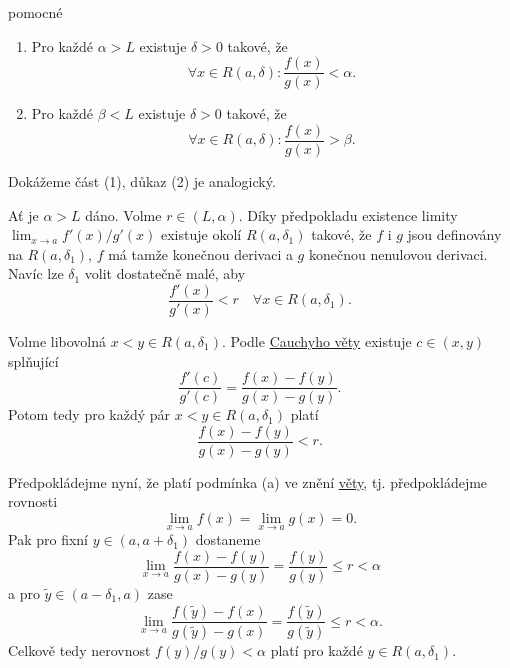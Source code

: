 \begin{lemma*}{pomocné}
 \begin{enumerate}
  \item Pro každé $\alpha > L$ existuje $\delta>0$ takové, že
  \[
   \forall x \in R(a,\delta): \frac{f(x)}{g(x)} < \alpha.
  \]
 \item Pro každé $\beta < L$ existuje $\delta>0$ takové, že
 \[
  \forall x \in R(a,\delta): \frac{f(x)}{g(x)} > \beta.
 \]
 \end{enumerate}
\end{lemma*}
\begin{lemproof}
 Dokážeme část (1), důkaz (2) je analogický.

 Ať je $\alpha > L$ dáno. Volme $r \in (L,\alpha)$. Díky předpokladu existence
 limity $\lim_{x \to a} f'(x) / g'(x)$ existuje okolí $R(a,\delta_1)$ takové,
 že $f$ i $g$ jsou definovány na $R(a,\delta_1)$, $f$ má tamže konečnou
 derivaci a $g$ konečnou nenulovou derivaci. Navíc lze $\delta_1$ volit
 dostatečně malé, aby
 \[
  \frac{f'(x)}{g'(x)} < r \quad \forall x \in R(a,\delta_1).
 \]
 
 Volme libovolná $x < y \in R(a,\delta_1)$. Podle
 \hyperref[thm:cauchyho-o-stredni-hodnote]{Cauchyho věty} existuje $c \in
 (x,y)$ splňující
 \[
  \frac{f'(c)}{g'(c)} = \frac{f(x) - f(y)}{g(x) - g(y)}.
 \]
 Potom tedy pro každý pár $x<y \in R(a,\delta_1)$ platí
 \[
  \frac{f(x) - f(y)}{g(x) - g(y)} < r.
 \]
 
 Předpokládejme nyní, že platí podmínka (a) ve znění
 \hyperref[thm:lhospitalovo-pravidlo]{věty}, tj. předpokládejme rovnosti
 \[
  \lim_{x \to a} f(x) = \lim_{x \to a} g(x) = 0.
 \]
 Pak pro fixní $y \in (a,a+\delta_1)$ dostaneme
 \[
  \lim_{x \to a} \frac{f(x) - f(y)}{g(x) - g(y)} = \frac{f(y)}{g(y)} \leq r <
  \alpha
 \]
 a pro $\tilde{y} \in (a-\delta_1,a)$ zase
 \[
  \lim_{x \to a} \frac{f(\tilde{y}) - f(x)}{g(\tilde{y}) - g(x)} =
  \frac{f(\tilde{y})}{g(\tilde{y})} \leq r <
  \alpha.
 \]
 Celkově tedy nerovnost $f(y) / g(y) < \alpha$ platí pro každé $y \in
 R(a,\delta_1)$.


\end{lemproof}

